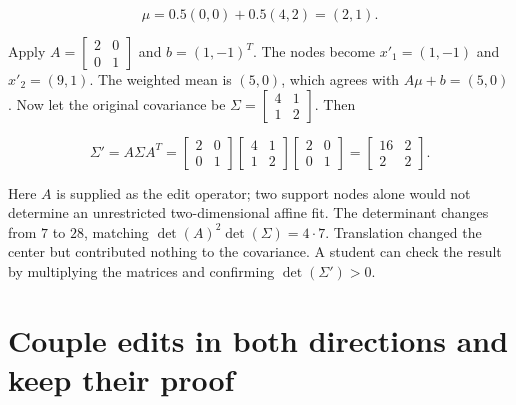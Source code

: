 \[
\mu=0.5(0,0)+0.5(4,2)=(2,1).
\]

Apply \(A=\begin{bmatrix}2&0\\0&1\end{bmatrix}\) and \(b=(1,-1)^T\). The nodes become \(x'_1=(1,-1)\) and \(x'_2=(9,1)\). The weighted mean is \((5,0)\), which agrees with \(A\mu+b=(5,0)\). Now let the original covariance be \(\Sigma=\begin{bmatrix}4&1\\1&2\end{bmatrix}\). Then

\[
\Sigma'=A\Sigma A^T=
\begin{bmatrix}2&0\\0&1\end{bmatrix}
\begin{bmatrix}4&1\\1&2\end{bmatrix}
\begin{bmatrix}2&0\\0&1\end{bmatrix}
=
\begin{bmatrix}16&2\\2&2\end{bmatrix}.
\]

Here \(A\) is supplied as the edit operator; two support nodes alone would not determine an unrestricted two-dimensional affine fit. The determinant changes from \(7\) to \(28\), matching \(\det(A)^2\det(\Sigma)=4\cdot7\). Translation changed the center but contributed nothing to the covariance. A student can check the result by multiplying the matrices and confirming \(\det(\Sigma')>0\).

\section{Couple edits in both directions and keep their proof}\label{04-visual-computing-ii-ch039-couple-edits-in-both-directions-and-keep-their-proof}

\hypertarget{04-visual-computing-ii-ch039-couple-edits-in-both-directions-and-keep-their-proof}{}

